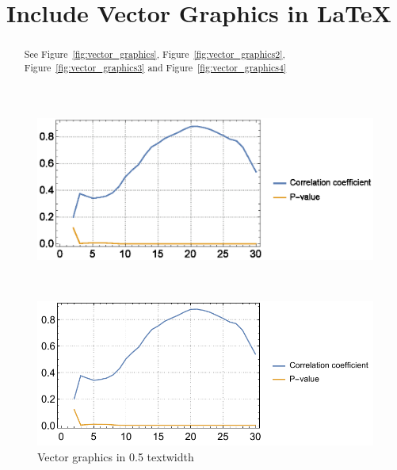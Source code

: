 \documentclass{egpubl}
\title[EG \LaTeX\ Author Guidelines]%
{Include Vector Graphics in \LaTeX\ }
\begin{document}
	
	
	\maketitle
	
	\begin{abstract}
		See Figure~\ref{fig:vector_graphics}, Figure~\ref{fig:vector_graphics2}, Figure~\ref{fig:vector_graphics3} and Figure~\ref{fig:vector_graphics4}
%		
		
	\end{abstract}

	
\begin{figure}
	\centering
	\begin{minipage}{.5\textwidth}
		\includegraphics[width=1\linewidth]{images/A_spearman.eps}
	\end{minipage}~
	\begin{minipage}{.5\textwidth}
		\includegraphics[width=1\linewidth]{images/A_spearman.pdf}
	\end{minipage}
	\caption{Vector graphics in 0.5 textwidth}
	\label{fig:vector_graphics}
\end{figure}
\end{document}
